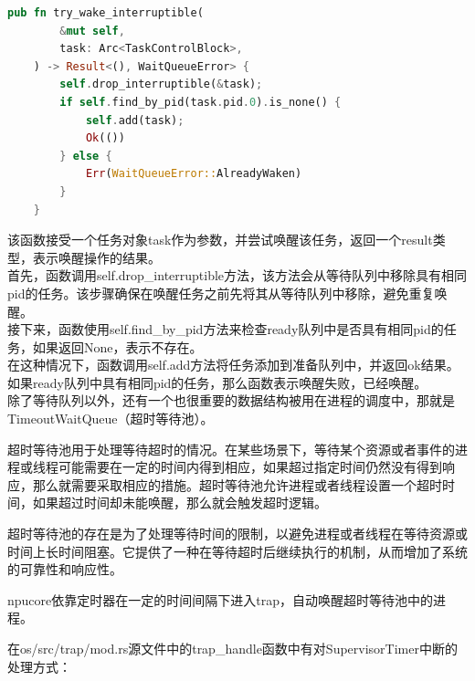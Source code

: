 \begin{lstlisting}[language=rust,caption={try_wake_interruptible方法}]
    pub fn try_wake_interruptible(
        &mut self,
        task: Arc<TaskControlBlock>,
    ) -> Result<(), WaitQueueError> {
        self.drop_interruptible(&task);
        if self.find_by_pid(task.pid.0).is_none() {
            self.add(task);
            Ok(())
        } else {
            Err(WaitQueueError::AlreadyWaken)
        }
    }
\end{lstlisting}
该函数接受一个任务对象task作为参数，并尝试唤醒该任务，返回一个result类型，表示唤醒操作的结果。\\
首先，函数调用self.drop_interruptible方法，该方法会从等待队列中移除具有相同pid的任务。该步骤确保在唤醒任务之前先将其从等待队列中移除，避免重复唤醒。\\
接下来，函数使用self.find_by_pid方法来检查ready队列中是否具有相同pid的任务，如果返回None，表示不存在。\\
在这种情况下，函数调用self.add方法将任务添加到准备队列中，并返回ok结果。\\
如果ready队列中具有相同pid的任务，那么函数表示唤醒失败，已经唤醒。\\

除了等待队列以外，还有一个也很重要的数据结构被用在进程的调度中，那就是TimeoutWaitQueue（超时等待池）。

超时等待池用于处理等待超时的情况。在某些场景下，等待某个资源或者事件的进程或线程可能需要在一定的时间内得到相应，如果超过指定时间仍然没有得到响应，那么就需要采取相应的措施。超时等待池允许进程或者线程设置一个超时时间，如果超过时间却未能唤醒，那么就会触发超时逻辑。

超时等待池的存在是为了处理等待时间的限制，以避免进程或者线程在等待资源或时间上长时间阻塞。它提供了一种在等待超时后继续执行的机制，从而增加了系统的可靠性和响应性。

npucore依靠定时器在一定的时间间隔下进入trap，自动唤醒超时等待池中的进程。

在os/src/trap/mod.rs源文件中的trap_handle函数中有对SupervisorTimer中断的处理方式：

